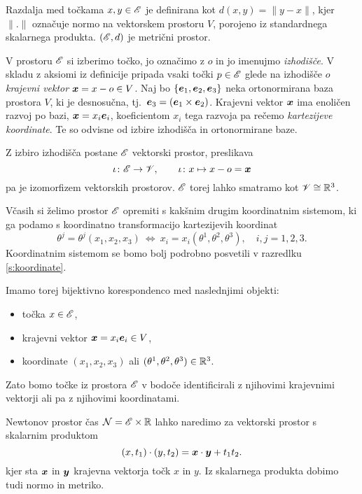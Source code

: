 Razdalja med točkama $x,y\in\mathscr E$ je definirana kot $d(x,y)=\|y-x\|$, kjer $\|.\|$ označuje normo na
vektorskem prostoru $V$, porojeno iz standardnega skalarnega produkta. $(\mathscr E,d)$ je metrični prostor.

V prostoru $\mathscr E$ si izberimo točko, jo označimo z $o$ in jo imenujmo \emph{izhodišče}.
V skladu z aksiomi iz definicije pripada vsaki točki $p\in\mathscr E$ glede na izhodišče $o$ \emph{krajevni vektor}
$\boldsymbol x=x-o\in V$. Naj bo $\{\boldsymbol e_1,\boldsymbol e_2,\boldsymbol e_3\}$ neka ortonormirana baza prostora $V$,
ki je desnosučna, tj.~$\boldsymbol e_3=(\boldsymbol e_1\times\boldsymbol e_2)$. Krajevni vektor $\boldsymbol x$
ima enoličen razvoj po bazi, $\boldsymbol x=x_i\boldsymbol e_i$, koeficientom $x_i$ tega razvoja pa rečemo
\emph{kartezijeve koordinate}. Te so odvisne od izbire izhodišča in ortonormirane baze.

Z izbiro izhodišča postane $\mathscr E$ vektorski prostor, preslikava
\[
	\iota\colon\mathscr E\to\mathscr V,\qquad\iota\colon x\mapsto x-o=\boldsymbol x
\]
pa je izomorfizem vektorskih prostorov. $\mathscr E$ torej lahko smatramo kot $\mathscr V\cong\mathbb R^3$.

Včasih si želimo prostor $\mathscr E$ opremiti s kakšnim drugim koordinatnim sistemom, ki ga podamo
s koordinatno transformacijo kartezijevih koordinat
\begin{equation}\label{e:kt}
	\theta^j = \theta^j(x_1,x_2,x_3) \ \Leftrightarrow \ x_i=x_i(\theta^1,\theta^2,\theta^3), \quad i,j=1,2,3.
\end{equation}
Koordinatnim sistemom se bomo bolj podrobno posvetili v razredlku \ref{s:koordinate}.

Imamo torej bijektivno korespondenco med naslednjimi objekti:
\begin{itemize}
	\item točka $x\in\mathscr E$,
	\item krajevni vektor $\boldsymbol x=x_i\boldsymbol e_i\in V$,
	\item koordinate $(x_1,x_2,x_3)$ ali $(\theta^1,\theta^2,\theta^3)\in\mathbb R^3$.
\end{itemize}
Zato bomo točke iz prostora $\mathscr E$ v bodoče identificirali z njihovimi krajevnimi
vektorji ali pa z njihovimi koordinatami.

Newtonov prostor čas $\mathcal{N}=\mathscr E\times\mathbb R$ lahko naredimo za vektorski prostor s skalarnim produktom
\[ (x,t_1)\cdot(y,t_2) = \boldsymbol x\cdot\boldsymbol y + t_1 t_2. \]
kjer sta $\boldsymbol x$ in $\boldsymbol y$ krajevna vektorja točk $x$ in $y$.
Iz skalarnega produkta dobimo tudi normo in metriko.


